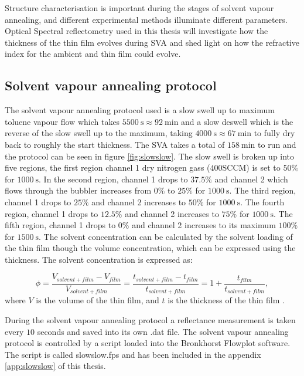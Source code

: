 \documentclass[MasterThesisMain.tex]{subfiles}
\begin{document}
Structure characterisation is important during the stages of solvent vapour annealing, and different experimental methods illuminate different parameters. Optical Spectral reflectometry used in this thesis will investigate how the thickness of the thin film evolves during SVA and shed light on how the refractive index for the ambient and thin film could evolve. 


\subsection{Solvent vapour annealing protocol} \label{sec:svaprotocol}
The solvent vapour annealing protocol used is a slow swell up to maximum toluene vapour flow which takes $\SI{5500}{\second}\approx\SI{92}{\minute}$ and a slow deswell which is the reverse of the slow swell up to the maximum, taking $\SI{4000}{\second}\approx\SI{67}{\minute}$ to fully dry back to roughly the start thickness. The SVA takes a total of $\SI{158}{\minute}$ to run and the protocol can be seen in figure \ref{fig:slowslow}. The slow swell is broken up into five regions, the first region channel 1 dry nitrogen gass ($400$SCCM) is set to $50 \%$ for $\SI{1000}{\second}$. In the second region, channel 1 drops to $37.5 \%$ and channel 2 which flows through the bubbler increases from $0 \%$ to $25 \%$ for $\SI{1000}{\second}$. The third region, channel 1 drops to $25 \%$ and channel 2 increases to $50 \%$ for $\SI{1000}{\second}$. The fourth region, channel 1 drops to $12.5 \%$ and channel 2 increases to $75 \%$ for $\SI{1000}{\second}$. The fifth region, channel 1 drops to $0 \%$ and channel 2 increases to its maximum $100 \%$ for $\SI{1500}{\second}$. The solvent concentration can be calculated by the solvent loading of the thin film though the volume concentration, which can be expressed using the thickness. The solvent concentration is expressed as:

\begin{equation}\label{eq:solcon}
\phi= \frac{V_{solvent+film}-V_{film}}{V_{solvent+film}} = \frac{t_{solvent+film}-t_{film}}{t_{solvent+film}} = 1+\frac{t_{film}}{t_{solvent+film}}, 
\end{equation}
where $V$ is the volume of the thin film, and $t$ is the thickness of the thin film \cite{solventconcentration}.

During the solvent vapour annealing protocol a reflectance measurement is taken every $10$ seconds and saved into its own .dat file. The solvent vapour annealing protocol is controlled by a script loaded into the Bronkhorst Flowplot software. The script is called slowslow.fps and has been included in the appendix \ref{app:slowslow} of this thesis.
\end{document}
